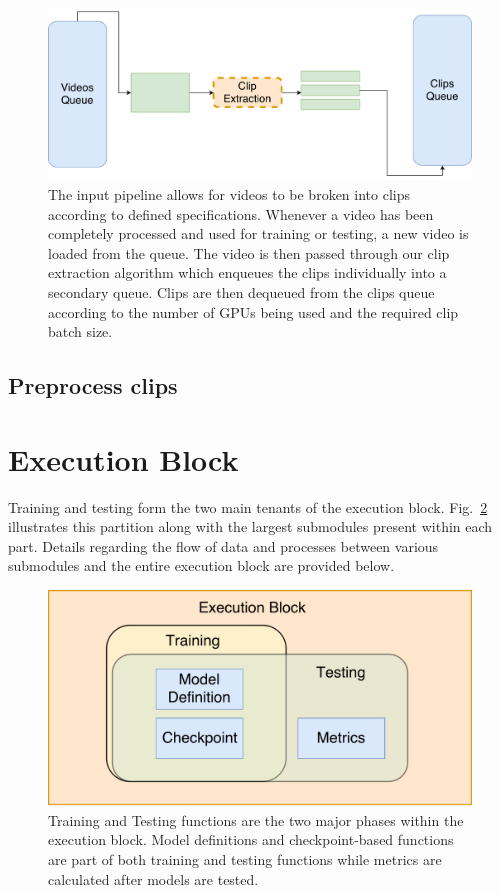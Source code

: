 \documentclass{llncs}
\begin{document}
\begin{figure}[b!]
\centering
\includegraphics[width=0.8\columnwidth]{images/extract_clips.pdf}
\caption{The input pipeline allows for videos to be broken into clips according to defined specifications.
Whenever a video has been completely processed and used for training or testing, a new video is loaded from the queue.
The video is then passed through our clip extraction algorithm which enqueues the clips individually into a secondary queue.
Clips are then dequeued from the clips queue according to the number of GPUs being used and the required clip batch size.}
\label{fig:extract_clips}
\end{figure}


\subsection{Preprocess clips}

\section{Execution Block}
\label{sec:execblock}
Training and testing form the two main tenants of the execution block. 
Fig.~\ref{fig:exec_block} illustrates this partition along with the largest submodules present within each part.
Details regarding the flow of data and processes between various submodules and the entire execution block are provided below.

\begin{figure}[t!]
\centering
\includegraphics[width=0.8\columnwidth]{images/exec_block.pdf}
\caption{Training and Testing functions are the two major phases within the execution block. Model definitions and checkpoint-based functions are part of both training and testing functions while metrics are calculated after models are tested.}
\label{fig:exec_block}
\end{figure}
\end{document}
